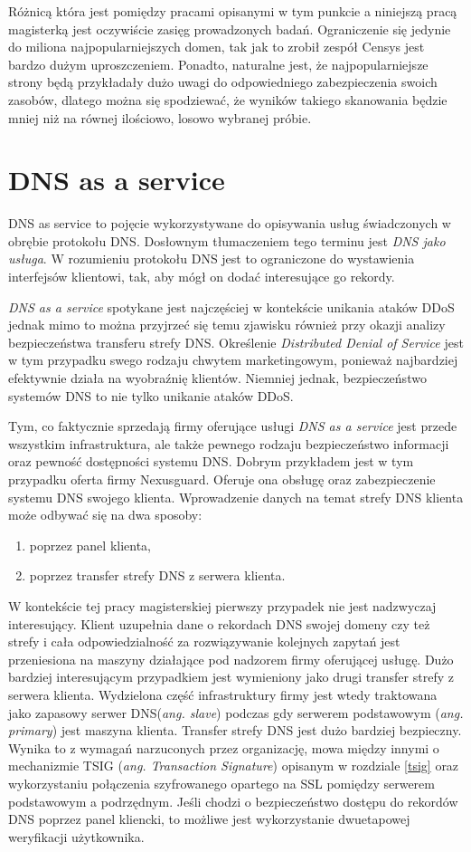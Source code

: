 Różnicą która jest pomiędzy pracami opisanymi w tym punkcie a niniejszą pracą magisterką jest oczywiście zasięg prowadzonych badań.
Ograniczenie się jedynie do miliona najpopularniejszych domen, tak jak to zrobił zespół Censys\cite{censys} jest bardzo dużym
uproszczeniem. Ponadto, naturalne jest, że najpopularniejsze strony będą przykładały dużo uwagi do odpowiedniego zabezpieczenia
swoich zasobów, dlatego można się spodziewać, że wyników takiego skanowania będzie mniej niż na równej ilościowo, losowo wybranej próbie.

\section{DNS as a service}
DNS as service to pojęcie wykorzystywane do opisywania usług świadczonych w obrębie protokołu DNS. Dosłownym tłumaczeniem tego
terminu jest \textit{DNS jako usługa}. W rozumieniu protokołu DNS jest to ograniczone do wystawienia interfejsów klientowi, tak,
aby mógł on dodać interesujące go rekordy.

\textit{DNS as a service} spotykane jest najczęściej w kontekście unikania ataków DDoS jednak mimo to można przyjrzeć się temu
zjawisku również przy okazji analizy bezpieczeństwa transferu strefy DNS. Określenie \textit{Distributed Denial of Service} jest w
tym przypadku swego rodzaju chwytem marketingowym, ponieważ najbardziej efektywnie działa na wyobraźnię klientów. Niemniej jednak,
bezpieczeństwo systemów DNS to nie tylko unikanie ataków DDoS.

Tym, co faktycznie sprzedają firmy oferujące usługi \textit{DNS as a service} jest przede wszystkim infrastruktura, ale także
pewnego rodzaju bezpieczeństwo informacji oraz pewność dostępności systemu DNS. Dobrym przykładem jest w tym przypadku oferta firmy
Nexusguard\cite{nexusguard}. Oferuje ona obsługę oraz zabezpieczenie systemu DNS swojego klienta. Wprowadzenie danych na temat strefy
DNS klienta może odbywać się na dwa sposoby:
\begin{enumerate}
	\item poprzez panel klienta,
	\item poprzez transfer strefy DNS z serwera klienta.
\end{enumerate}
W kontekście tej pracy magisterskiej pierwszy przypadek nie jest nadzwyczaj interesujący. Klient uzupełnia dane o rekordach DNS
swojej domeny czy też strefy i cała odpowiedzialność za rozwiązywanie kolejnych zapytań jest przeniesiona na maszyny działające
pod nadzorem firmy oferującej usługę. Dużo bardziej interesującym przypadkiem jest wymieniony jako drugi transfer strefy z serwera
klienta. Wydzielona część infrastruktury firmy jest wtedy traktowana jako zapasowy serwer DNS(\textit{ang. slave}) podczas gdy
serwerem podstawowym (\textit{ang. primary}) jest maszyna klienta. Transfer strefy DNS jest dużo bardziej bezpieczny. Wynika to
z wymagań narzuconych przez organizację, mowa między innymi o mechanizmie TSIG (\textit{ang. Transaction Signature})  opisanym w
rozdziale \ref{tsig} oraz wykorzystaniu połączenia szyfrowanego opartego na SSL pomiędzy serwerem podstawowym a podrzędnym. Jeśli
chodzi o bezpieczeństwo dostępu do rekordów DNS poprzez panel kliencki, to możliwe jest wykorzystanie dwuetapowej weryfikacji użytkownika.

